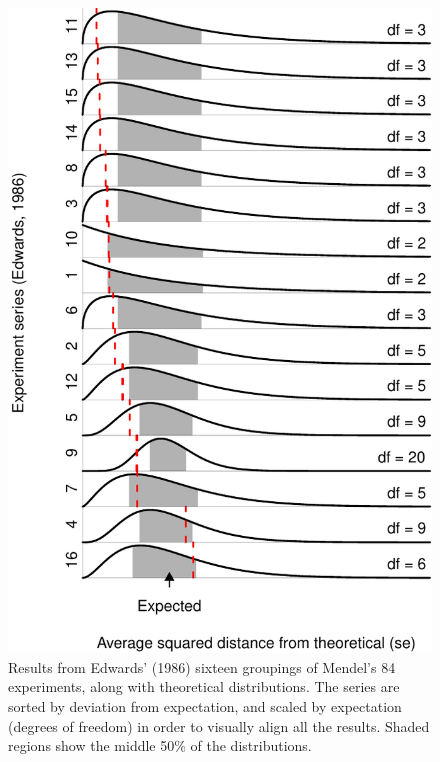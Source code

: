 \documentclass[english,floatsintext,man]{apa6}
\theoremstyle{definition}
\theoremstyle{definition}
\theoremstyle{definition}
\theoremstyle{remark}
\begin{document}
\begin{figure}
\centering
\includegraphics{paper_pdf_files/figure-latex/MendelChi216-1.pdf}
\caption{\label{fig:MendelChi216}Results from Edwards' (1986) sixteen
groupings of Mendel's 84 experiments, along with theoretical
distributions. The series are sorted by deviation from expectation, and
scaled by expectation (degrees of freedom) in order to visually align
all the results. Shaded regions show the middle 50\% of the
distributions.}
\end{figure}
\end{document}
